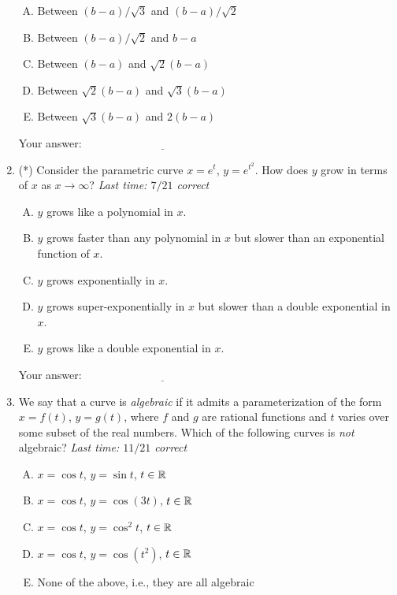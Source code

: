 \documentclass[10pt]{amsart}
\begin{document}
\begin{enumerate}
  \begin{enumerate}[(A)]
  \item Between $(b - a)/\sqrt{3}$ and $(b - a)/\sqrt{2}$
  \item Between $(b - a)/\sqrt{2}$ and $b - a$
  \item Between $(b - a)$ and $\sqrt{2}(b - a)$
  \item Between $\sqrt{2}(b - a)$ and $\sqrt{3}(b - a)$
  \item Between $\sqrt{3}(b - a)$ and $2(b - a)$
  \end{enumerate}

  \vspace{0.1in}
  Your answer: $\underline{\qquad\qquad\qquad\qquad\qquad\qquad\qquad}$
  \vspace{0.6in}

\item (*) Consider the parametric curve $x = e^t$, $y = e^{t^2}$. How
  does $y$ grow in terms of $x$ as $x \to \infty$? {\em Last time:
    $7/21$ correct}

  \begin{enumerate}[(A)]
  \item $y$ grows like a polynomial in $x$.
  \item $y$ grows faster than any polynomial in $x$ but slower than an
    exponential function of $x$.
  \item $y$ grows exponentially in $x$.
  \item $y$ grows super-exponentially in $x$ but slower than a double
    exponential in $x$.
  \item $y$ grows like a double exponential in $x$.
  \end{enumerate}

  \vspace{0.1in}
  Your answer: $\underline{\qquad\qquad\qquad\qquad\qquad\qquad\qquad}$
  \vspace{0.6in}

\item We say that a curve is {\em algebraic} if it admits a
  parameterization of the form $x = f(t)$, $y = g(t)$, where $f$ and
  $g$ are rational functions and $t$ varies over some subset of the
  real numbers. Which of the following curves is {\em not} algebraic?
  {\em Last time: $11/21$ correct}

  \begin{enumerate}[(A)]
  \item $x = \cos t$, $y = \sin t$, $t \in \mathbb{R}$
  \item $x = \cos t$, $y = \cos(3t)$, $t \in \mathbb{R}$
  \item $x = \cos t$, $y = \cos^2t$, $t \in \mathbb{R}$
  \item $x = \cos t$, $y = \cos(t^2)$, $t \in \mathbb{R}$
  \item None of the above, i.e., they are all algebraic
  \end{enumerate}


\end{enumerate}
\end{document}
